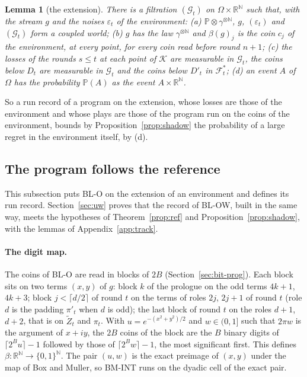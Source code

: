 \documentclass[11pt]{amsart}
\newtheorem{lemma}[theorem]{Lemma}
\theoremstyle{definition}
\numberwithin{equation}{section}
\newcommand{\R}{\mathbb{R}}
\newcommand{\Prob}{\mathbb{P}}
\newcommand{\cK}{\mathcal{K}}
\newcommand{\cG}{\mathscr{G}}
\newcommand{\cF}{\mathscr{F}}
\begin{document}
\begin{lemma}[the extension]\label{lem:ext}
There is a filtration $(\cG_t)$ on $\Omega\times\R^{\mathbb N}$ such that, with the stream $g$ and the noises $\varepsilon_t$ of the environment: (a) $\Prob\otimes\gamma^{\otimes\mathbb N}$, $g$, $(\varepsilon_t)$ and $(\cG_t)$ form a coupled world; (b) $g$ has the law $\gamma^{\otimes\mathbb N}$ and $\beta(g)_j$ is the coin $c_j$ of the environment, at every point, for every coin read before round $n+1$; (c) the losses of the rounds $s\le t$ at each point of $\cK$ are measurable in $\cG_t$, the coins below $D_t$ are measurable in $\cG_t$ and the coins below $D'_t$ in $\cF^*_t$; (d) an event $A$ of $\Omega$ has the probability $\Prob(A)$ as the event $A\times\R^{\mathbb N}$.
\end{lemma}

So a run record of a program on the extension, whose losses are those of the environment and whose plays are those of the program run on the coins of the environment, bounds by Proposition~\ref{prop:shadow} the probability of a large regret in the environment itself, by (d).

\subsection{The program follows the reference}\label{sec:bit-track}

This subsection puts BL-O on the extension of an environment and defines its run record. Section~\ref{sec:uw} proves that the record of BL-OW, built in the same way, meets the hypotheses of Theorem~\ref{prop:ref} and Proposition~\ref{prop:shadow}, with the lemmas of Appendix~\ref{app:track}.

\paragraph{The digit map.} The coins of BL-O are read in blocks of $2B$ (Section~\ref{sec:bit-prog}). Each block sits on two terms $(x,y)$ of $g$: block $k$ of the prologue on the odd terms $4k+1$, $4k+3$; block $j<\lceil d/2\rceil$ of round $t$ on the terms of roles $2j$, $2j+1$ of round $t$ (role $d$ is the padding $\pi'_t$ when $d$ is odd); the last block of round $t$ on the roles $d+1$, $d+2$, that is on $\tilde Z_t$ and $\pi_t$. With $u=e^{-(x^2+y^2)/2}$ and $w\in(0,1]$ such that $2\pi w$ is the argument of $x+iy$, the $2B$ coins of the block are the $B$ binary digits of $\lceil2^Bu\rceil-1$ followed by those of $\lceil2^Bw\rceil-1$, the most significant first. This defines $\beta:\R^{\mathbb N}\to\{0,1\}^{\mathbb N}$. The pair $(u,w)$ is the exact preimage of $(x,y)$ under the map of Box and Muller, so BM-INT runs on the dyadic cell of the exact pair.
\end{document}
